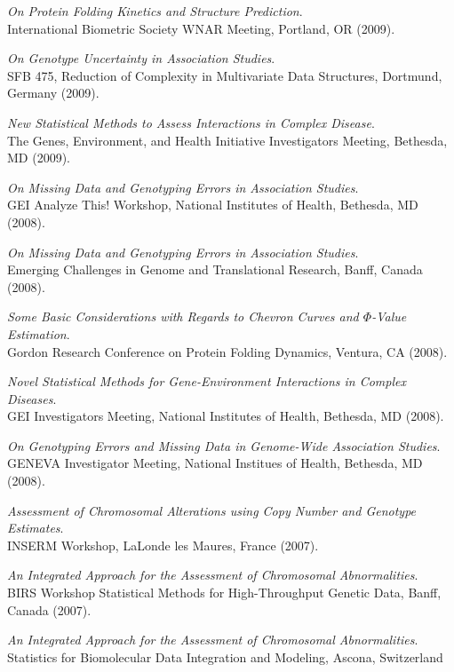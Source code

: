 \documentclass[10pt]{article}
\newcommand{\dn}[1]{{\color{black} {#1}}}
\begin{document}
{\it On Protein Folding Kinetics and Structure Prediction}.\\
International Biometric Society WNAR Meeting, \dn{Portland, OR}
(2009).
\item 
{\it On Genotype Uncertainty in Association Studies}.\\
SFB 475, Reduction of Complexity in Multivariate Data Structures, \dn{Dortmund, Germany}
(2009).
\item
{\it New Statistical Methods to Assess Interactions in Complex Disease}.\\
The Genes, Environment, and Health Initiative Investigators Meeting, \dn{Bethesda, MD}
(2009).
\item
{\it On Missing Data and Genotyping Errors in Association Studies}.\\
GEI Analyze This! Workshop, National Institutes of Health, \dn{Bethesda, MD}
(2008).
\item
{\it On Missing Data and Genotyping Errors in Association Studies}.\\
Emerging Challenges in Genome and Translational Research, \dn{Banff, Canada}
(2008).
\item
{\it Some Basic Considerations with Regards to Chevron Curves and $\Phi$-Value Estimation}.\\
Gordon Research Conference on Protein Folding Dynamics, Ventura, CA
(2008).
\item
{\it Novel Statistical Methods for Gene-Environment Interactions in Complex Diseases}.\\
GEI Investigators Meeting, National Institutes of Health, \dn{Bethesda, MD}
(2008).
\item
{\it On Genotyping Errors and Missing Data in Genome-Wide Association Studies}.\\
GENEVA Investigator Meeting, National Institues of Health, \dn{Bethesda, MD}
(2008).
\item
{\it Assessment of Chromosomal Alterations using Copy Number and Genotype Estimates}.\\
INSERM Workshop, \dn{LaLonde les Maures, France}
(2007).
\item
{\it An Integrated Approach for the Assessment of Chromosomal Abnormalities}.\\
BIRS Workshop Statistical Methods for High-Throughput Genetic Data, \dn{Banff, Canada}
(2007).
\item
{\it An Integrated Approach for the Assessment of Chromosomal
Abnormalities}.\\
Statistics for Biomolecular Data Integration and Modeling, \dn{Ascona, Switzerland}
\end{document}
